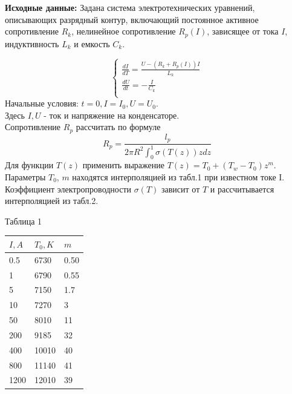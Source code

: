 \documentclass[14pt, a4paper]{extarticle}
\begin{document}
	\textbf{Исходные данные:} Задана  система  электротехнических  уравнений,  описывающих  разрядный  контур, включающий постоянное активное сопротивление $R_k$, нелинейное сопротивление $R_p(I)$, зависящее от тока $I$, индуктивность $L_k$ и емкость $C_k$.\par
	
	
	
	\begin{equation*}
		\begin{cases}
			\frac{dI}{dT} = \frac{U - (R_k + R_p(I))I}{L_k} \\
			\frac{dU}{dt} = - \frac{I}{C_k}\\
		\end{cases}
	\end{equation*}
	Начальные условия: $t = 0, I = I_0, U = U_0$.\\
	Здесь $I, U$ - ток и напряжение на конденсаторе.\\
	Сопротивление $R_p$ рассчитать по формуле
	\begin{equation*}
		R_p = \frac{l_p}{2 \pi R^2 \int_{0}^{1}\sigma(T(z))zdz}
	\end{equation*}
	Для функции $T(z)$ применить выражение $T(z) = T_0 + (T_w - T_0)z^m$.\\
	Параметры $T_0$, $m$ находятся интерполяцией из табл.1 при известном токе I.\\
	Коэффициент электропроводности $\sigma(T)$ зависит от $T$ и рассчитывается интерполяцией из табл.2.\par
	\newpage
	Таблица 1\par
	\begin{table}[h]
		\begin{tabular}{|l|l|l|}\hline
			$I, A$    & $T_0, K$  & $m$\\ \hline
			0.5 & 6730  & 0.50 \\
			1 & 6790  & 0.55 \\
			5 & 7150  & 1.7 \\
			10 & 7270  & 3 \\
			50 & 8010  & 11\\
			200 & 9185  & 32 \\
			400 & 10010  & 40 \\
			800 & 11140  & 41 \\
			1200 & 12010  & 39 \\
			\hline     
		\end{tabular}
	\end{table}\par
	
\end{document}

